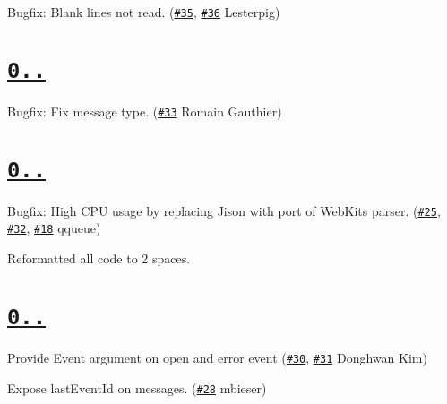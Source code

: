 \begin{DoxyItemize}
\item Bugfix\+: Blank lines not read. (\href{https://github.com/aslakhellesoy/eventsource-node/issues/35}{\tt \#35}, \href{https://github.com/aslakhellesoy/eventsource-node/pull/36}{\tt \#36} Lesterpig)
\end{DoxyItemize}

\section*{\href{https://github.com/aslakhellesoy/eventsource-node/compare/v0.1.0...v0.1.1}{\tt 0..}}


\begin{DoxyItemize}
\item Bugfix\+: Fix message type. (\href{https://github.com/aslakhellesoy/eventsource-node/pull/33}{\tt \#33} Romain Gauthier)
\end{DoxyItemize}

\section*{\href{https://github.com/aslakhellesoy/eventsource-node/compare/v0.0.10...v0.1.0}{\tt 0..}}


\begin{DoxyItemize}
\item Bugfix\+: High C\+PU usage by replacing Jison with port of Web\+Kit\textquotesingle{}s parser. (\href{https://github.com/aslakhellesoy/eventsource-node/issues/25}{\tt \#25}, \href{https://github.com/aslakhellesoy/eventsource-node/pull/32}{\tt \#32}, \href{https://github.com/aslakhellesoy/eventsource-node/issues/18}{\tt \#18} qqueue)
\item Reformatted all code to 2 spaces.
\end{DoxyItemize}

\section*{\href{https://github.com/aslakhellesoy/eventsource-node/compare/v0.0.9...v0.0.10}{\tt 0..}}


\begin{DoxyItemize}
\item Provide {\ttfamily Event} argument on {\ttfamily open} and {\ttfamily error} event (\href{https://github.com/aslakhellesoy/eventsource-node/issues/30}{\tt \#30}, \href{https://github.com/aslakhellesoy/eventsource-node/pull/31}{\tt \#31} Donghwan Kim)
\item Expose {\ttfamily last\+Event\+Id} on messages. (\href{https://github.com/aslakhellesoy/eventsource-node/pull/28}{\tt \#28} mbieser)
\end{DoxyItemize}

